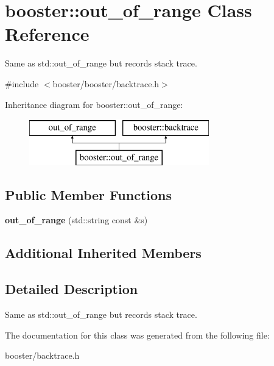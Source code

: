 \section{booster\-:\-:out\-\_\-of\-\_\-range Class Reference}
\label{classbooster_1_1out__of__range}


Same as std\-::out\-\_\-of\-\_\-range but records stack trace.  




{\ttfamily \#include $<$booster/booster/backtrace.\-h$>$}

Inheritance diagram for booster\-:\-:out\-\_\-of\-\_\-range\-:\begin{figure}[H]
\begin{center}
\leavevmode
\includegraphics[height=2.000000cm]{classbooster_1_1out__of__range}
\end{center}
\end{figure}
\subsection*{Public Member Functions}
\begin{DoxyCompactItemize}
\item 
{\bfseries out\-\_\-of\-\_\-range} (std\-::string const \&s)\label{classbooster_1_1out__of__range_a8682d7da97d49768d8c0b3bd5338c4cc}

\end{DoxyCompactItemize}
\subsection*{Additional Inherited Members}


\subsection{Detailed Description}
Same as std\-::out\-\_\-of\-\_\-range but records stack trace. 

The documentation for this class was generated from the following file\-:\begin{DoxyCompactItemize}
\item 
booster/backtrace.\-h\end{DoxyCompactItemize}
